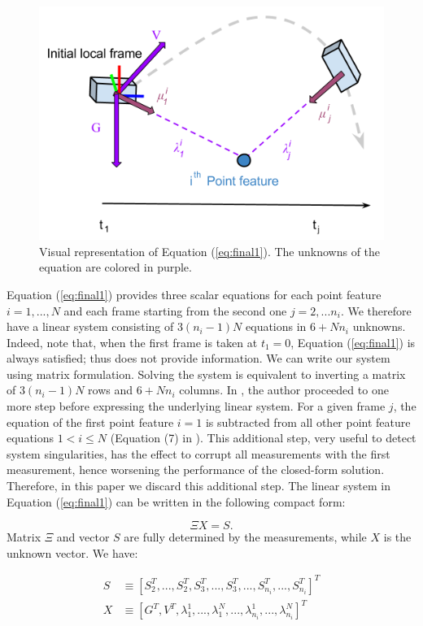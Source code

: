 \documentclass[letterpaper, 10 pt, journal, twoside]{IEEEtran}  %
\begin{document}
\begin{figure}
  \centering
  \includegraphics[width=0.7\columnwidth, trim={0 2cm 0 0}, clip]{images/closedFormExplained}
  \caption{Visual representation of Equation (\ref{eq:final1}).
  The unknowns of the equation are colored in \textcolor{amethyst}{purple}.}
\end{figure}

Equation (\ref{eq:final1}) provides three scalar equations for each point feature $i=1,...,N$ and each frame starting from the second one $j=2,...n_i$.
We therefore have a linear system consisting of $3(n_i-1)N$ equations in $6 + Nn_i$ unknowns.
Indeed, note that, when the first frame is taken at $t_1 = 0$,
Equation (\ref{eq:final1}) is always satisfied; thus does not provide information.
We can write our system using matrix formulation.
Solving the system is equivalent to inverting a matrix of $3(n_i-1)N$ rows and $6+Nn_i$ columns.
In \cite{Martinelli2014}, the author proceeded to one more step before expressing the underlying linear system.
For a given frame $j$, the equation of the first point feature $i=1$ is subtracted from all other point feature equations $1<i \leq N$ (Equation (7) in \cite{Martinelli2014}).
This additional step, very useful to detect system singularities, has the effect to corrupt all measurements with the first measurement,
hence worsening the performance of the closed-form solution. Therefore,
in this paper we discard this additional step.
The linear system in Equation (\ref{eq:final1}) can be written in the following compact form:

\begin{equation}
\label{eq:mat1}
\Xi X = S.
\end{equation}
\noindent Matrix $\Xi$ and vector $S$ are fully determined by the measurements, while $X$ is the unknown vector.
We have:

\begin{equation*}
  \begin{aligned}
S &\equiv [S_2^T, ...,S_2^T, S_3^T,...,S_3^T,...,S_{n_i}^T,...,S_{n_i}^T]^T \\
X &\equiv [ G^T, V^T, \lambda_1^1, ..., \lambda_1^N, ..., \lambda_{n_i}^1, ..., \lambda_{n_i}^N]^T
  \end{aligned}
\end{equation*}
\vspace{-1cm}
\end{document}
